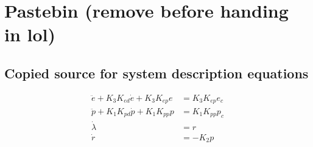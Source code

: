 \section{Pastebin (remove before handing in lol)}

\subsection{Copied source for system description equations}
\begin{subequations}
\label{eq:model_al}
\begin{align}
	\ddot{e} + K_{3} K_{ed} \dot{e} + K_{3} K_{ep} e &= K_{3} K_{ep} e_{c} \label{eq:model_se_al_elev} \\
	\ddot{p} + K_{1} K_{pd} \dot{p} + K_{1} K_{pp} p &= K_{1} K_{pp} p_{c} \label{eq:model_se_al_pitch} \\
	\dot{\lambda} &= r \label{eq:model_se_al_lambda} \\
	\dot{r} &= -K_{2} p \label{eq:model_se_al_r} 
\end{align}
\end{subequations}